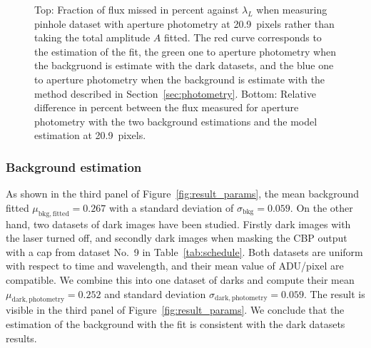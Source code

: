 \begin{figure}[h]
     \centering
     \caption{Top: Fraction of flux missed in percent against $\lambda_L$ when measuring \spinhole pinhole dataset with aperture photometry at \SI{20.9}{pixels} rather than taking the total amplitude $A$ fitted. The red curve corresponds to the estimation of the fit, the green one to aperture photometry when the backgruond is estimate with the dark datasets, and the blue one to aperture photometry when the background is estimate with the method described in Section~\ref{sec:photometry}. Bottom: Relative difference in percent between the flux measured for aperture photometry with the two background estimations and the model estimation at \SI{20.9}{pixels}.}
     \label{fig:bias_aperture}
\end{figure}

\subsubsection{Background estimation}
\label{sec:bkg}

As shown in the third panel of Figure~\ref{fig:result_params}, the mean background fitted $\mu_\mathrm{bkg, fitted}=0.267$ with a standard deviation of $\sigma_\mathrm{bkg}=0.059$. On the other hand, two datasets of dark images have been studied. Firstly dark images with the laser turned off, and secondly dark images when masking the CBP output with a cap from dataset No.~9 in Table~\ref{tab:schedule}. Both datasets are uniform with respect to time and wavelength, and their mean value of ADU/pixel are compatible. We combine this into one dataset of darks and compute their mean $\mu_\mathrm{dark, photometry}=0.252$ and standard deviation $\sigma_\mathrm{dark, photometry}=0.059$. The result is visible in the third panel of Figure~\ref{fig:result_params}. We conclude that the estimation of the background with the fit is consistent with the dark datasets results.

